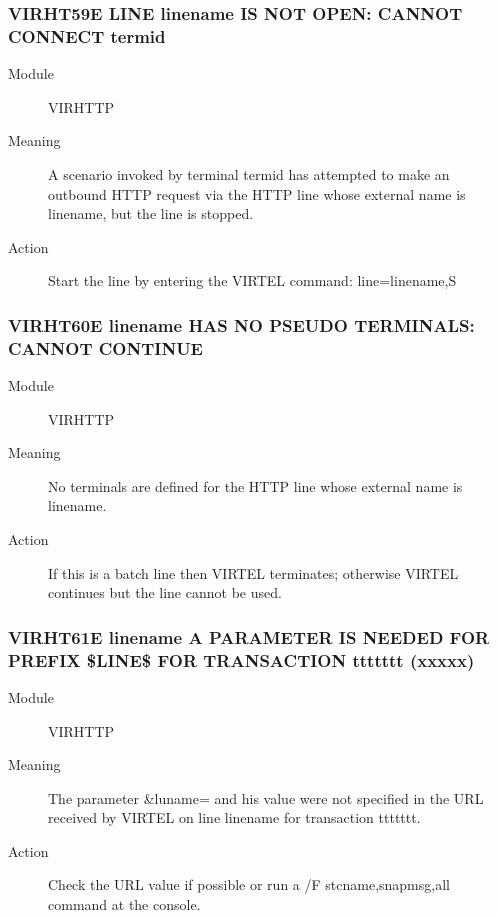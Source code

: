 \documentclass[letterpaper,10pt,english]{sphinxmanual}
\begin{document}
\subsubsection{VIRHT59E LINE linename IS NOT OPEN: CANNOT CONNECT termid}
\label{\detokenize{messages:virht59e-line-linename-is-not-open-cannot-connect-termid}}\begin{description}
\item[{Module}] \leavevmode
VIRHTTP

\item[{Meaning}] \leavevmode
A scenario invoked by terminal termid has attempted to make an outbound HTTP request via the HTTP line whose external name is linename, but the line is stopped.

\item[{Action}] \leavevmode
Start the line by entering the VIRTEL command: line=linename,S

\end{description}


\subsubsection{VIRHT60E linename HAS NO PSEUDO TERMINALS: CANNOT CONTINUE}
\label{\detokenize{messages:virht60e-linename-has-no-pseudo-terminals-cannot-continue}}\begin{description}
\item[{Module}] \leavevmode
VIRHTTP

\item[{Meaning}] \leavevmode
No terminals are defined for the HTTP line whose external name is linename.

\item[{Action}] \leavevmode
If this is a batch line then VIRTEL terminates; otherwise VIRTEL continues but the line cannot be used.

\end{description}


\subsubsection{VIRHT61E linename A PARAMETER IS NEEDED FOR PREFIX \$LINE\$ FOR TRANSACTION ttttttt (xxxxx)}
\label{\detokenize{messages:virht61e-linename-a-parameter-is-needed-for-prefix-line-for-transaction-ttttttt-xxxxx}}\begin{description}
\item[{Module}] \leavevmode
VIRHTTP

\item[{Meaning}] \leavevmode
The parameter \&luname= and his value were not specified in the URL received by VIRTEL on line linename for transaction ttttttt.

\item[{Action}] \leavevmode
Check the URL value if possible or run a /F stcname,snapmsg,all command at the console.

\end{description}
\end{document}
